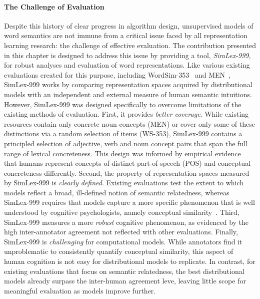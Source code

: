 \paragraph{The Challenge of Evaluation} Despite this history of clear progress in algorithm design, unsupervised models of word semantics are not immune from a critical issue faced by all representation learning research: the challenge of effective evaluation. 
The contribution presented in this chapter is designed to address this issue by providing a tool, \emph{SimLex-999}, for robust analyses and evaluation of word representations. Like various existing evaluations created for this purpose, including WordSim-353~\citep{finkelstein2001placing} and MEN~\citep{bruni2014multimodal}, SimLex-999 works by comparing representation spaces acquired by distributional models with an independent and external measure of human semantic intuitions. However, SimLex-999 was designed specifically to overcome limitations of the existing methods of evaluation. First, it provides \emph{better coverage}. While existing resources contain only concrete noun concepts (MEN) or cover only some of these distinctions via a random selection of items (WS-353), SimLex-999 contains a principled selection of adjective, verb and noun concept pairs that span the full range of lexical concreteness. This design was informed by empirical evidence that humans represent concepts of distinct part-of-speech (POS) \citep{gentner1978relational} and conceptual concreteness \citep{hill2013quantitative} differently. Second, the property of representation spaces measured by SimLex-999 is \emph{clearly defined}. Existing evaluations test the extent to which models reflect a broad, ill-defined notion of semantic relatedness, whereas SimLex-999 requires that models capture a more specific phenomenon that is well understood by cognitive psychologists, namely conceptual similarity~\citep{tversky1977features}. Third, SimLex-999 measures a more \emph{robust} cognitive phenomenon, as evidenced by the high inter-annotator agreement not reflected with other evaluations. Finally,  SimLex-999 is \emph{challenging} for computational models. While annotators find it unproblematic to consistently quantify conceptual similarity, this aspect of human cognition is not easy for distributional models to replicate. In contrast, for existing evaluations that focus on semantic relatedness, the best distributional models already surpass the inter-human agreement leve, leaving little scope for meaningful evaluation as models improve further. 

